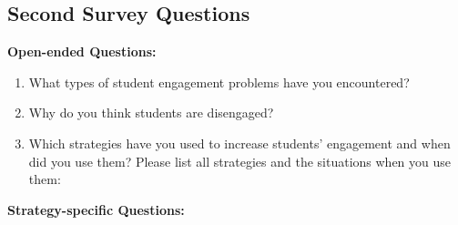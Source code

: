 \subsection{Second Survey Questions}

\textbf{Open-ended Questions: }

\begin{enumerate}
    \item What types of student engagement problems have you encountered?
    \item Why do you think students are disengaged?
    \item Which strategies have you used to increase students' engagement and when did you use them? Please list all strategies and the situations when you use them:
\end{enumerate}

\textbf{Strategy-specific Questions: }

